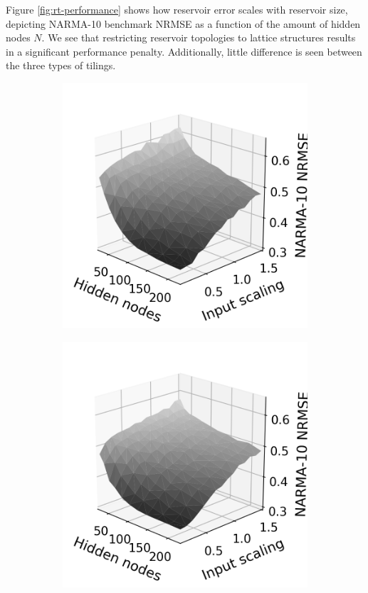 Figure \ref{fig:rt-performance} shows how reservoir error scales with reservoir
size, depicting NARMA-10 benchmark NRMSE as a function of the amount of hidden
nodes $N$. We see that restricting reservoir topologies to lattice structures
results in a significant performance penalty. Additionally, little difference is
seen between the three types of tilings.

\begin{figure}[htb]
  \centering
  \begin{subfigure}{.32\textwidth}
    \centering
    \includegraphics[width=1.0\linewidth]{figures/regular-tilings-performance-is-sq.png}
    \caption{}
    \label{fig:rt-is-square}
  \end{subfigure}
  \begin{subfigure}{.32\textwidth}
    \centering
    \includegraphics[width=1.0\linewidth]{figures/regular-tilings-performance-is-hex.png}

\end{subfigure}
\end{figure}
